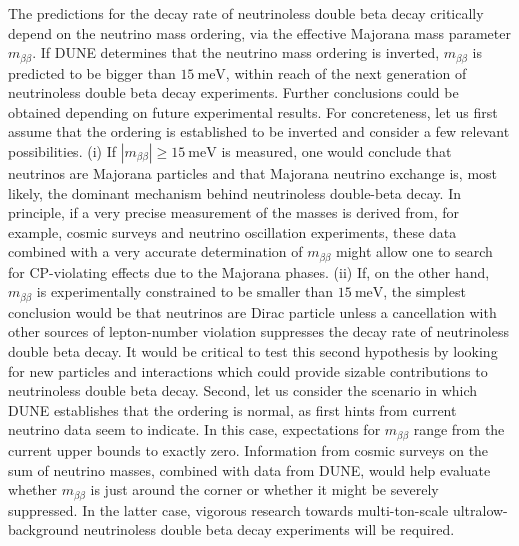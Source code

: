 The predictions for the decay rate of neutrinoless double beta decay critically depend on the neutrino mass ordering, via the effective Majorana mass parameter $m_{\beta \beta}$. If DUNE determines that the neutrino mass ordering is inverted, $m_{\beta \beta}$ is predicted to be bigger than $15~\mathrm{meV}$, within reach of the next generation of neutrinoless double beta decay experiments. Further conclusions could be obtained depending on future experimental results. For concreteness, let us first assume that the ordering is established to be inverted and consider a few relevant possibilities. (i) If  $|m_{\beta \beta}| \geq 15~\mathrm{meV}$ is measured, one would conclude that neutrinos are Majorana particles and that Majorana neutrino exchange is, most likely, the dominant mechanism behind neutrinoless double-beta decay. In principle, if a very precise measurement of the masses is derived from, for example, cosmic surveys and neutrino oscillation experiments, these data combined with a very accurate determination of $m_{\beta \beta}$ might allow one to search for CP-violating effects due to the Majorana phases. (ii) If, on the other hand, $m_{\beta \beta}$ is experimentally constrained to be smaller than  $15~\mathrm{meV}$, the simplest conclusion would be that neutrinos are Dirac particle unless a cancellation with other sources of lepton-number violation suppresses the decay rate of neutrinoless double beta decay. It would be critical to test this second hypothesis by looking for new particles and interactions which could provide sizable contributions to neutrinoless double beta decay. Second, let us consider the scenario in which DUNE establishes that the ordering is normal, as first hints from current neutrino data seem to indicate. In this case, expectations for $m_{\beta \beta}$ range from the current upper bounds to exactly zero. Information from cosmic surveys on the sum of neutrino masses, combined with data from DUNE, would help evaluate whether $m_{\beta \beta}$ is just around the corner or whether it might be severely suppressed. In the latter case, vigorous research towards multi-ton-scale ultralow-background neutrinoless double beta decay experiments will be required.  

%

